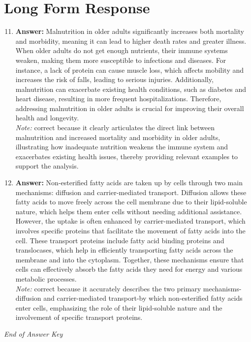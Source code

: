 \documentclass[12pt]{article}
\begin{document}
\section*{Long Form Response}
\begin{enumerate}[label=\arabic*.]
\setcounter{enumi}{10}
\item \textbf{Answer:} Malnutrition in older adults significantly increases both mortality and morbidity, meaning it can lead to higher death rates and greater illness. When older adults do not get enough nutrients, their immune systems weaken, making them more susceptible to infections and diseases. For instance, a lack of protein can cause muscle loss, which affects mobility and increases the risk of falls, leading to serious injuries. Additionally, malnutrition can exacerbate existing health conditions, such as diabetes and heart disease, resulting in more frequent hospitalizations. Therefore, addressing malnutrition in older adults is crucial for improving their overall health and longevity.
\\ \textit{Note:} correct because it clearly articulates the direct link between malnutrition and increased mortality and morbidity in older adults, illustrating how inadequate nutrition weakens the immune system and exacerbates existing health issues, thereby providing relevant examples to support the analysis.
\item \textbf{Answer:} Non-esterified fatty acids are taken up by cells through two main mechanisms: diffusion and carrier-mediated transport. Diffusion allows these fatty acids to move freely across the cell membrane due to their lipid-soluble nature, which helps them enter cells without needing additional assistance. However, the uptake is often enhanced by carrier-mediated transport, which involves specific proteins that facilitate the movement of fatty acids into the cell. These transport proteins include fatty acid binding proteins and translocases, which help in efficiently transporting fatty acids across the membrane and into the cytoplasm. Together, these mechanisms ensure that cells can effectively absorb the fatty acids they need for energy and various metabolic processes.
\\ \textit{Note:} correct because it accurately describes the two primary mechanisms-diffusion and carrier-mediated transport-by which non-esterified fatty acids enter cells, emphasizing the role of their lipid-soluble nature and the involvement of specific transport proteins.
\end{enumerate}

\vfill
\noindent\textit{End of Answer Key}
\end{document}
